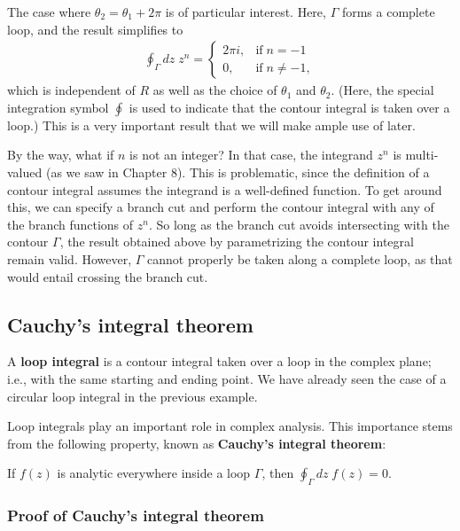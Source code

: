 \documentclass[10pt,a4paper]{article}
\begin{document}
The case where $\theta_2 = \theta_1 + 2\pi$ is of particular interest.
Here, $\Gamma$ forms a complete loop, and the result simplifies to
\begin{align}
  \oint_{\Gamma} dz\; z^n = \left\{\begin{array}{ll}2\pi i, & \mathrm{if}\;n = -1 \\ \displaystyle 0,&\mathrm{if}\;n\ne -1,\end{array}\right.
\end{align}
which is independent of $R$ as well as the choice of $\theta_1$ and
$\theta_2$.  (Here, the special integration symbol $\oint$ is used to
indicate that the contour integral is taken over a loop.)  This is a
very important result that we will make ample use of later.

By the way, what if $n$ is not an integer? In that case, the integrand
$z^n$ is multi-valued (as we saw in Chapter 8). This is problematic,
since the definition of a contour integral assumes the integrand is a
well-defined function. To get around this, we can specify a branch cut
and perform the contour integral with any of the branch functions of
$z^n$. So long as the branch cut avoids intersecting with the contour
$\Gamma$, the result obtained above by parametrizing the contour
integral remain valid.  However, $\Gamma$ cannot properly be taken
along a complete loop, as that would entail crossing the branch cut.

\subsection{Cauchy's integral theorem}
\label{cauchys-integral-theorem}

A \textbf{loop integral} is a contour integral taken over a loop in
the complex plane; i.e., with the same starting and ending point. We
have already seen the case of a circular loop integral in the previous
example.

Loop integrals play an important role in complex analysis. This
importance stems from the following property, known as
\textbf{Cauchy's integral theorem}:

\begin{framed}
If $f(z)$ is analytic everywhere inside a loop $\Gamma$, then $\displaystyle\oint_\Gamma dz\; f(z) = 0.$
\end{framed}

\subsubsection{Proof of Cauchy's integral theorem}
\label{proof-of-cauchys-integral-theorem}
\end{document}
